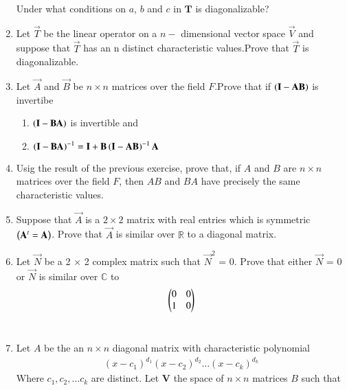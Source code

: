 \begin{enumerate}[label=\thesubsection.\arabic*.,ref=\thesubsection.\theenumi]
	Under what conditions on $a$, $b$ and $c$ in $\mathbf{T}$ is diagonalizable?
%
\\
\solution

\twocolumn
\item Let $\vec{T}$ be the linear operator on a $n-$ dimensional vector space $\vec{V}$ and suppose that  $\vec{T}$ has an n distinct characteristic values.Prove that $\vec{T}$ is diagonalizable.
%
\\
\solution

\twocolumn
\item Let $\vec{A}$ and $\vec{B}$ be $n\times n$ matrices over the field $F$.Prove that if $\left(\mathbf{I}-\mathbf{A}\mathbf{B}\right)$ is invertibe
\begin{enumerate}
    \item $\left(\mathbf{I}-\mathbf{B}\mathbf{A}\right)$ is invertible and
    \item $\left(\mathbf{I}-\mathbf{B}\mathbf{A}\right)^{-1}=\mathbf{I}+\mathbf{B}\left(\mathbf{I}-\mathbf{A}\mathbf{B}\right)^{-1}\mathbf{A}$
\end{enumerate}
%
\solution

\item Usig the result of the previous exercise, prove that, if $A$ and $B$ are $n \times n$ matrices over the field $F$, then $AB$ and $BA$ have precisely the same characteristic values.
%
\solution

\item Suppose that $\vec{A}$ is a $2\times2$ matrix with real entries which is symmetric $\left(\mathbf{A}^t=\mathbf{A}\right)$.
Prove that $\vec{A}$ is similar over $\mathbb{R}$ to a diagonal matrix. 
%
\\
\solution

\twocolumn
\item Let $\vec{N}$ be a 2 × 2 complex matrix such that $\vec{N}^2$ = 0. Prove that either $\vec{N}$ = 0 or $\vec{N}$ is similar over $\mathbb{C}$ to\\
\begin{align}
\begin{pmatrix}0&0\\1&0\end{pmatrix}
\end{align}
%
\\
\solution

\twocolumn
\item Let $A$ be the an $n \times n$ diagonal matrix with characteristic polynomial
\begin{align}
(x-c_1)^{d_1} (x-c_2)^{d_2} \dots (x-c_k)^{d_k} \label{eq:solutions/6/2/14/1.1}
\end{align}
Where $c_1, c_2,  \dots c_k $ are distinct. Let $\mathbf{V}$ the space of $n \times n$ matrices $B$ such that 

\end{enumerate}
